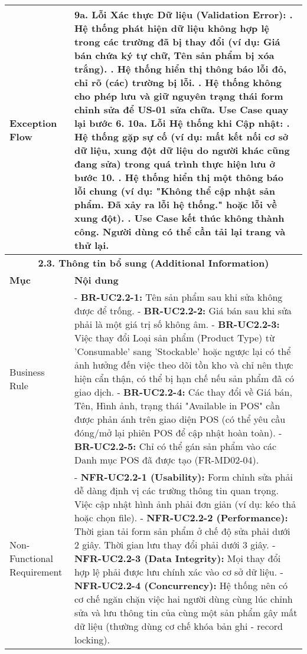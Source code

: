 \begin{longtable}{|m{4cm}|p{11cm}|}
\hline
Exception Flow & \textbf{9a. Lỗi Xác thực Dữ liệu (Validation Error):} \newline    1. Hệ thống phát hiện dữ liệu không hợp lệ trong các trường đã bị thay đổi (ví dụ: Giá bán chứa ký tự chữ, Tên sản phẩm bị xóa trắng). \newline    2. Hệ thống hiển thị thông báo lỗi đỏ, chỉ rõ (các) trường bị lỗi. \newline    3. Hệ thống không cho phép lưu và giữ nguyên trạng thái form chỉnh sửa để US-01 sửa chữa. Use Case quay lại bước 6. \newline \textbf{10a. Lỗi Hệ thống khi Cập nhật:} \newline    1. Hệ thống gặp sự cố (ví dụ: mất kết nối cơ sở dữ liệu, xung đột dữ liệu do người khác cũng đang sửa) trong quá trình thực hiện lưu ở bước 10. \newline    2. Hệ thống hiển thị một thông báo lỗi chung (ví dụ: "Không thể cập nhật sản phẩm. Đã xảy ra lỗi hệ thống." hoặc lỗi về xung đột). \newline    3. Use Case kết thúc không thành công. Người dùng có thể cần tải lại trang và thử lại. \\
\hline
\multicolumn{2}{|c|}{\textbf{2.3. Thông tin bổ sung (Additional Information)}} \\
\hline
\textbf{Mục} & \textbf{Nội dung} \\
\hline
Business Rule & - \textbf{BR-UC2.2-1:} Tên sản phẩm sau khi sửa không được để trống. \newline - \textbf{BR-UC2.2-2:} Giá bán sau khi sửa phải là một giá trị số không âm. \newline - \textbf{BR-UC2.2-3:} Việc thay đổi Loại sản phẩm (Product Type) từ 'Consumable' sang 'Stockable' hoặc ngược lại có thể ảnh hưởng đến việc theo dõi tồn kho và chỉ nên thực hiện cẩn thận, có thể bị hạn chế nếu sản phẩm đã có giao dịch. \newline - \textbf{BR-UC2.2-4:} Các thay đổi về Giá bán, Tên, Hình ảnh, trạng thái "Available in POS" cần được phản ánh trên giao diện POS (có thể yêu cầu đóng/mở lại phiên POS để cập nhật hoàn toàn). \newline - \textbf{BR-UC2.2-5:} Chỉ có thể gán sản phẩm vào các Danh mục POS đã được tạo (FR-MD02-04). \\
\hline
Non-Functional Requirement & - \textbf{NFR-UC2.2-1 (Usability):} Form chỉnh sửa phải dễ dàng định vị các trường thông tin quan trọng. Việc cập nhật hình ảnh phải đơn giản (ví dụ: kéo thả hoặc chọn file). \newline - \textbf{NFR-UC2.2-2 (Performance):} Thời gian tải form sản phẩm ở chế độ sửa phải dưới 2 giây. Thời gian lưu thay đổi phải dưới 3 giây. \newline - \textbf{NFR-UC2.2-3 (Data Integrity):} Mọi thay đổi hợp lệ phải được lưu chính xác vào cơ sở dữ liệu. \newline - \textbf{NFR-UC2.2-4 (Concurrency):} Hệ thống nên có cơ chế ngăn chặn việc hai người dùng cùng lúc chỉnh sửa và lưu thông tin của cùng một sản phẩm gây mất dữ liệu (thường dùng cơ chế khóa bản ghi - record locking). \\
\hline

\end{longtable}


